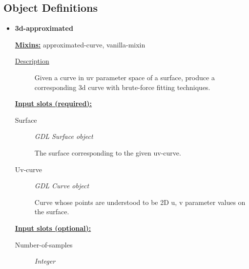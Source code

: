\documentclass [11pt]{book}
\begin{document}
\subsection{Object Definitions}




\begin{itemize}

\item {}
\label{prim:3d-approximated}
\textbf{3d-approximated}


\textbf{
\underline{Mixins:}} approximated-curve, vanilla-mixin





\begin{description}

\item [
\underline{Description}]


Given a curve in uv parameter space of
  a surface, produce a corresponding 3d curve with brute-force fitting
  techniques.



\end{description}








\textbf{
\underline{Input slots (required):}}

\begin{description}

\item [Surface]
\emph{GDL Surface object}

 The surface corresponding to the given uv-curve.




\item [Uv-curve]
\emph{GDL Curve object}

 Curve whose points are understood to be 2D u, v
parameter values on the surface.




\end{description}






\textbf{
\underline{Input slots (optional):}}

\begin{description}

\item [Number-of-samples]
\emph{Integer}


\end{description}
\end{itemize}
\end{document}
